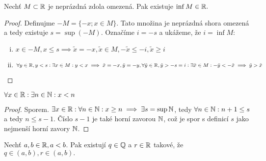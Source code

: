 \begin{theorem}
    Nechť $M \subset \mathbb{R}$ je neprázdná zdola omezená. Pak existuje 
    $\inf M \in \mathbb{R}.$
\end{theorem}

\begin{proof}
    Definujme $-M = \{ -x; x \in M \}$. Tato množina je neprázdná shora omezená
    a tedy existuje $s = \sup(-M).$ Označíme $i = -s$ a ukážeme, že $i = \inf M$:
    \begin{enumerate}[i.]
        \item $x \in -M, x \leq s \implies \tilde{x} = -x, \tilde{x} \in M, 
            -\tilde{x} \leq -i, \tilde{x} \geq i$
        \item $\forall y \in \mathbb{R}, y < s: \exists x \in M: y < x \implies
            \tilde{x} = -x, \tilde{y} = -y, \forall \tilde{y} \in \mathbb{R}, \tilde{y} > -s = i:
            \exists \tilde{x} \in M: -\tilde{y} < -\tilde{x} \implies \tilde{y} > \tilde{x}$
    \end{enumerate}
\end{proof}

\begin{theorem}
    \label{th:archimedes}
    $\forall x \in \mathbb{R}: \exists n \in \mathbb{N}: x < n$
\end{theorem}

\begin{proof}
    Sporem. $\exists x \in \mathbb{R}: \forall n \in \mathbb{N}: x \geq n \implies \exists 
    s = \sup \mathbb{N}$, tedy $\forall n \in \mathbb{N}: n+1 \leq s$ a tedy $n \leq s - 1$.
    Číslo $s-1$ je také horní zavorou $\mathbb{N}$, což je spor s definicí $s$ jako 
    nejmenší horní zavory $\mathbb{N}$.
\end{proof}

\begin{theorem}
    \label{th:hustotaqrq}
    Nechť $a,b \in \mathbb{R}, a < b$. Pak existují $q \in \mathbb{Q}$ a $r \in \mathbb{R}$ takové, že
    $q \in (a,b), r \in (a,b).$
\end{theorem}

